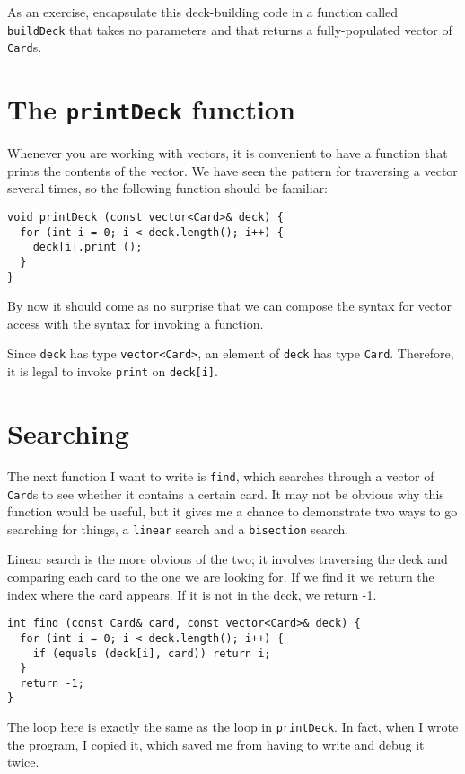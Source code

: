 
As an exercise, encapsulate this deck-building code in a function called
{\tt buildDeck} that takes no parameters and that returns a
fully-populated vector of {\tt Card}s.

\section{The {\tt printDeck} function}
\label{printdeck}

Whenever you are working with vectors, it is convenient to have
a function that prints the contents of the vector.  We have
seen the pattern for traversing a vector several times, so the
following function should be familiar:

\begin{verbatim}
void printDeck (const vector<Card>& deck) {
  for (int i = 0; i < deck.length(); i++) {
    deck[i].print ();
  }
}
\end{verbatim}
%
By now it should come as no surprise that we can compose the
syntax for vector access with the syntax for invoking a function.

Since {\tt deck} has type {\tt vector<Card>}, an element of {\tt deck}
has type {\tt Card}.  Therefore, it is legal to invoke {\tt print}
on {\tt deck[i]}.

\section{Searching}
\label{find}

The next function I want to write is {\tt find}, which searches
through a vector of {\tt Card}s to see whether it contains a certain
card.  It may not be obvious why this function would be useful, but it
gives me a chance to demonstrate two ways to go searching for things,
a {\tt linear} search and a {\tt bisection} search.


Linear search is the more obvious of the two; it involves traversing
the deck and comparing each card to the one we are looking for.  If we
find it we return the index where the card appears.  If it is not in
the deck, we return -1.

\begin{verbatim}
int find (const Card& card, const vector<Card>& deck) {
  for (int i = 0; i < deck.length(); i++) {
    if (equals (deck[i], card)) return i;
  }
  return -1;
}
\end{verbatim}
%
The loop here is exactly the same as the loop in {\tt printDeck}.
In fact, when I wrote the program, I copied it, which saved me
from having to write and debug it twice.

